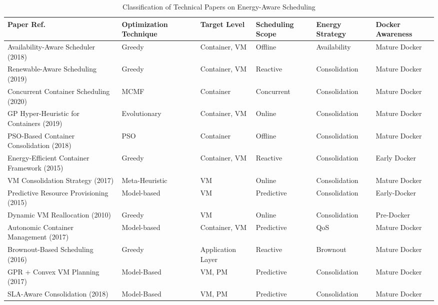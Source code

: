 \begin{table}[H]
\centering
\footnotesize
\begin{tabular}{|p{3.8cm}|p{2.3cm}|p{1.6cm}|p{2.3cm}|p{2.2cm}|p{2cm}|}
\hline
\textbf{Paper Ref.} & \textbf{Optimization Technique} & \textbf{Target Level} & \textbf{Scheduling Scope} & \textbf{Energy Strategy} & \textbf{Docker Awareness} \\
\hline
Availability-Aware Scheduler\cite{alahmad_availability-aware_2018} (2018) & Greedy & Container, VM & Offline & Availability & Mature Docker\\
\hline
Renewable-Aware Scheduling\cite{kumar_renewable_2019} (2019)& Greedy & Container, VM & Reactive & Consolidation & Mature Docker \\
\hline
Concurrent Container Scheduling\cite{hu_concurrent_2020} (2020)& MCMF & Container & Concurrent & Consolidation & Mature Docker \\
\hline
GP Hyper-Heuristic for Containers\cite{tan_hybrid_2019} (2019)& Evolutionary & Container, VM & Online & Consolidation & Mature Docker \\
\hline
PSO-Based Container Consolidation\cite{shi_energy-aware_2018} (2018)& PSO & Container & Offline & Consolidation & Mature Docker \\
\hline
Energy-Efficient Container Framework\cite{piraghaj_framework_2015} (2015)& Greedy & Container, VM & Reactive & Consolidation & Early Docker \\
\hline
VM Consolidation Strategy\cite{carrega_energy-aware_2017} (2017)& Meta-Heuristic & VM & Online & Consolidation & Mature Docker \\
\hline
Predictive Resource Provisioning\cite{dabbagh_energy-efficient_2015} (2015)& Model-based  & VM & Predictive & Consolidation & Early-Docker \\
\hline
Dynamic VM Reallocation\cite{beloglazov_energy_2010} (2010) & Greedy & VM & Online & Consolidation & Pre-Docker \\
\hline
Autonomic Container Management\cite{barna_delivering_2017} (2017) & Model-based & Container, VM & Predictive & QoS & Mature Docker \\
\hline
Brownout-Based Scheduling\cite{xu_energy_2016} (2016)& Greedy & Application Layer & Reactive & Brownout & Mature Docker \\
\hline
GPR + Convex VM Planning\cite{bui_energy_2017} (2017) & Model-Based & VM, PM & Predictive & Consolidation & Mature Docker \\
\hline
SLA-Aware Consolidation\cite{li_sla-aware_2018} (2018) & Model-Based & VM, PM & Predictive & Consolidation & Mature Docker \\
\hline
\end{tabular}
\caption{Classification of Technical Papers on Energy-Aware Scheduling}
\label{tab:technical_papers}
\end{table}


